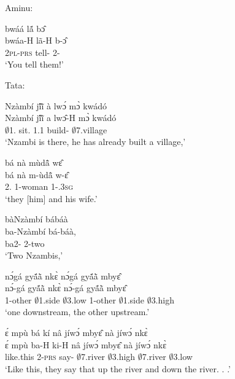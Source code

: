 \noindent Aminu:

\begin{exe}[(N234)]
\exN\label{n07}
  \glll  bwáá lã́ bɔ̂  \\
         bwáa-H lã-H b-ɔ̂ \\
            2\textsc{pl}-\textsc{prs} tell-{\R} 2-{\OBJ}     \\
    \trans `You tell them!'
\end{exe}

\noindent Tata:

\begin{exe}[(N234)] 
\exN\label{n08}
  \glll  Nzàmbí jĩ́ĩ̀ à lwɔ́ mɔ̀ kwádó \\
         Nzàmbí jĩ́ĩ̀ a lwɔ̂-H mɔ̀ kwádó \\
             $\emptyset$1.{\PN} sit.{\COMPL} 1.{\PST}1  build-{\R} {\COMPL} $\emptyset$7.village    \\
    \trans `Nzambi is there, he has already built a village,'
 
\exN\label{n09}
  \glll  bá nà mùdã̂ wɛ̂ \\
         bá nà m-ùdã̂ w-ɛ̂\\
           2.{\SBJ}  {\COM} 1-woman 1-{\POSS}.3\textsc{sg}  \\
    \trans `they [him] and his wife.'
 
\exN\label{n10}
  \glll  bàNzàmbí bábáà \\
        ba-Nzàmbí bá-báà, \\
           ba2-{\PN} 2-two  \\
    \trans `Two Nzambis,'
 
\exN\label{n11}
  \glll  nɔ́gá gyã́ã̀ nkɛ̀ nɔ́gá gyã́ã̀ mbyɛ̂ \\
         nɔ́-gá gyã́ã̀ nkɛ̀ nɔ́-gá gyã́ã̀ mbyɛ̂ \\
           1-other $\emptyset$1.side $\emptyset$3.low 1-other $\emptyset$1.side $\emptyset$3.high  \\
    \trans `one downstream, the other upstream.'
 
\exN\label{n12}
  \glll  ɛ́ mpù bá kí nâ jíwɔ́ mbyɛ̂ nà jíwɔ́ nkɛ̀\\
         ɛ́ mpù ba-H ki-H nâ jíwɔ́ mbyɛ̂ nà jíwɔ́ nkɛ̀\\
           {\LOC} like.this 2-\textsc{prs} say-{\R} {\COMP} $\emptyset$7.river  $\emptyset$3.high {\CONJ} $\emptyset$7.river $\emptyset$3.low\\
    \trans `Like this, they say that up the river and down the river. . .'
 

\end{exe}
